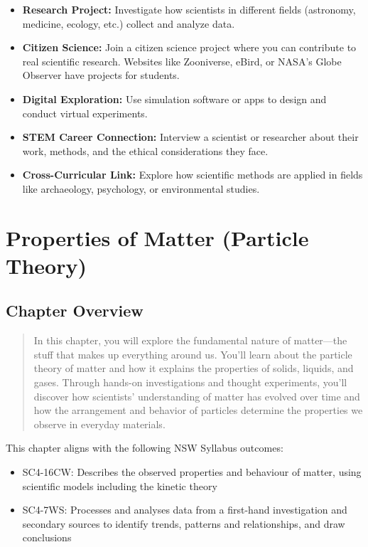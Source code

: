 \documentclass[justified,notoc]{tufte-book}
\begin{document}
\begin{itemize}
    \item \textbf{Research Project:} Investigate how scientists in different fields (astronomy, medicine, ecology, etc.) collect and analyze data.
    
    \item \textbf{Citizen Science:} Join a citizen science project where you can contribute to real scientific research. Websites like Zooniverse, eBird, or NASA's Globe Observer have projects for students.
    
    \item \textbf{Digital Exploration:} Use simulation software or apps to design and conduct virtual experiments.
    
    \item \textbf{STEM Career Connection:} Interview a scientist or researcher about their work, methods, and the ethical considerations they face.
    
    \item \textbf{Cross-Curricular Link:} Explore how scientific methods are applied in fields like archaeology, psychology, or environmental studies.
\end{itemize}

\chapter{Properties of Matter (Particle Theory)}

\section*{Chapter Overview}

\begin{quote}
    In this chapter, you will explore the fundamental nature of matter—the stuff that makes up everything around us. You'll learn about the particle theory of matter and how it explains the properties of solids, liquids, and gases. Through hands-on investigations and thought experiments, you'll discover how scientists' understanding of matter has evolved over time and how the arrangement and behavior of particles determine the properties we observe in everyday materials.
\end{quote}

\noindent This chapter aligns with the following NSW Syllabus outcomes:
\begin{itemize}
    \item SC4-16CW: Describes the observed properties and behaviour of matter, using scientific models including the kinetic theory
    \item SC4-7WS: Processes and analyses data from a first-hand investigation and secondary sources to identify trends, patterns and relationships, and draw conclusions
\end{itemize}
\end{document}
